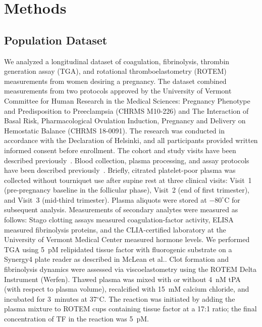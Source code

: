 \section{Methods}
\label{sec:methods}

\subsection{Population Dataset}
\label{sec:dataset}
We analyzed a longitudinal dataset of coagulation, fibrinolysis, thrombin generation
assay (TGA), and rotational thromboelastometry (ROTEM) measurements from women
desiring a pregnancy. The dataset combined measurements from two protocols approved by the
University of Vermont Committee for Human Research in the Medical Sciences: Pregnancy
Phenotype and Predisposition to Preeclampsia (CHRMS M10-226) and The Interaction of Basal
Risk, Pharmacological Ovulation Induction, Pregnancy and Delivery on Hemostatic Balance
(CHRMS 18-0091). The research was conducted in accordance with the Declaration of Helsinki,
and all participants provided written informed consent before enrollment.
The cohort and study visits have been described previously~\citep{Bernstein2016,Psoinos2021}.
Blood collection, plasma processing, and assay protocols have been described
previously~\citep{McLean2012TGA,Hale2012}. Briefly, citrated platelet-poor plasma
was collected without tourniquet use after supine rest at three clinical visits:
Visit~1 (pre-pregnancy baseline in the follicular phase), Visit~2 (end of first
trimester), and Visit~3 (mid-third trimester). Plasma aliquots were stored at
$-80^{\circ}$C for subsequent analysis. Measurements of secondary analytes were
measured as follows: Stago clotting assays measured coagulation-factor activity, ELISA
measured fibrinolysis proteins, and the CLIA-certified laboratory at the University of Vermont
Medical Center measured hormone levels. We performed TGA using 5~pM relipidated tissue factor with
fluorogenic substrate on a Synergy4 plate reader as described
in McLean et al.\citep{McLean2012TGA}. Clot formation and fibrinolysis dynamics were assessed via
viscoelastometry using the ROTEM Delta Instrument (Werfen). Thawed plasma was mixed
with or without 4~nM tPA (with respect to plasma volume), recalcified with 15~mM
calcium chloride, and incubated for 3~minutes at 37$^{\circ}$C. The reaction was
initiated by adding the plasma mixture to ROTEM cups containing tissue factor at a
17:1 ratio; the final concentration of TF in the reaction was 5~pM.

